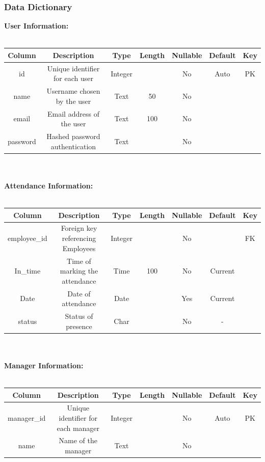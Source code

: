 \documentclass[a4paper, 12pt]{article}
\begin{document}
\subsubsection{Data Dictionary}
\textbf{User Information:\\\\}
\begin{tabular}{|c|c|c|c|c|c|c|}
    \hline
    \textbf{Column} & \textbf{Description} & \textbf{Type} & \textbf{Length} & \textbf{Nullable} & \textbf{Default} & \textbf{Key} \\
    \hline
    id & Unique identifier for each user & Integer & & No & Auto & PK \\
    \hline
    name & Username chosen by the user & Text & 50 & No & & \\
    \hline
    email & Email address of the user & Text & 100 & No & & \\
    \hline
    password & Hashed password authentication & Text & & No & & \\
    \hline
\end{tabular}
\\\\
\textbf{Attendance Information:\\\\}
\begin{tabular}{|c|c|c|c|c|c|c|}
    \hline
    \textbf{Column} & \textbf{Description} & \textbf{Type} & \textbf{Length} & \textbf{Nullable} & \textbf{Default} & \textbf{Key} \\
    \hline
    employee\_id & Foreign key referencing Employees & Integer & & No & & FK \\
    \hline
    In\_time & Time of marking the attendance & Time & 100 & No & Current & \\
    \hline
    Date & Date of attendance & Date & & Yes & Current & \\
    \hline
    status & Status of presence & Char & & No & - & \\
    \hline
\end{tabular}
\\\\
\textbf{Manager Information:\\\\}
\begin{tabular}{|c|c|c|c|c|c|c|}
    \hline
    \textbf{Column} & \textbf{Description} & \textbf{Type} & \textbf{Length} & \textbf{Nullable} & \textbf{Default} & \textbf{Key} \\
    \hline
    manager\_id & Unique identifier for each manager & Integer & & No & Auto & PK \\
    \hline
    name & Name of the manager & Text & & No & & \\
    \hline
\end{tabular}
\end{document}
